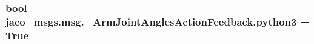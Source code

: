 \subsubsection[{\texorpdfstring{python3}{python3}}]{\setlength{\rightskip}{0pt plus 5cm}bool jaco\+\_\+msgs.\+msg.\+\_\+\+Arm\+Joint\+Angles\+Action\+Feedback.\+python3 = True}\hypertarget{namespacejaco__msgs_1_1msg_1_1__ArmJointAnglesActionFeedback_a67c4fbef760e6b6d22f215c3ab2ed730}{}\label{namespacejaco__msgs_1_1msg_1_1__ArmJointAnglesActionFeedback_a67c4fbef760e6b6d22f215c3ab2ed730}
